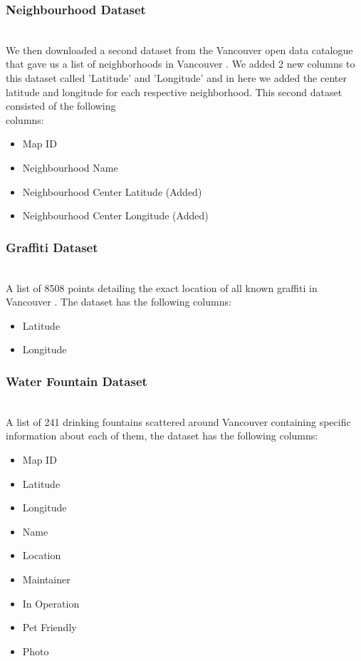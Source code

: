 \documentclass[conference]{IEEEtran}
\begin{document}
\subsubsection{Neighbourhood Dataset}

~\\We then downloaded a second dataset from the Vancouver open data catalogue that gave us a list of neighborhoods in Vancouver \cite{nb}.
We added 2 new columns to this dataset called ’Latitude’ and ’Longitude’ and in here we added the center
latitude and longitude for each respective neighborhood. This second dataset consisted of the following\\
columns:\\

\begin{itemize}
  \item Map ID
  \item Neighbourhood Name
  \item Neighbourhood Center Latitude (Added)
  \item Neighbourhood Center Longitude (Added)\\
\end{itemize}

\subsubsection{Graffiti Dataset}

~\\A list of 8508 points detailing the exact location of all known graffiti in Vancouver \cite{graffiti}. The dataset has the
following columns:\\

\begin{itemize}
  \item Latitude 
  \item Longitude\\
\end{itemize}

\subsubsection{Water Fountain Dataset}

~\\A list of 241 drinking fountains scattered around Vancouver \cite{fountain} containing specific information about each of them, the dataset has the following
columns:\\

\begin{itemize}
  \item Map ID 
  \item Latitude
  \item Longitude
  \item Name
  \item Location
  \item Maintainer
  \item In Operation
  \item Pet Friendly
  \item Photo\\
\end{itemize}
\end{document}
